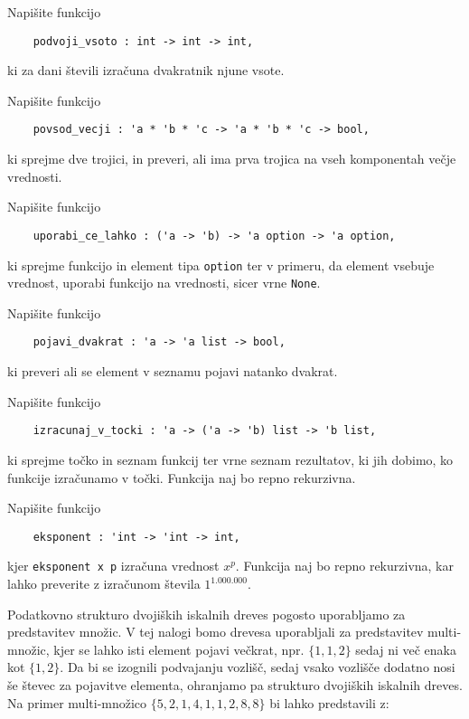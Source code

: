 \documentclass[arhiv]{../izpit}
\begin{document}

\naloga[]

\podnaloga
Napišite funkcijo
\begin{verbatim}
    podvoji_vsoto : int -> int -> int,
\end{verbatim}
ki za dani števili izračuna dvakratnik njune vsote.

\podnaloga
Napišite funkcijo
\begin{verbatim}
    povsod_vecji : 'a * 'b * 'c -> 'a * 'b * 'c -> bool,
\end{verbatim}
ki sprejme dve trojici, in preveri, ali ima prva trojica na vseh komponentah večje vrednosti.

\podnaloga
Napišite funkcijo
\begin{verbatim}
    uporabi_ce_lahko : ('a -> 'b) -> 'a option -> 'a option,
\end{verbatim}
ki sprejme funkcijo in element tipa \verb|option| ter v primeru, da element vsebuje vrednost, uporabi funkcijo na vrednosti, sicer vrne \verb|None|.

\podnaloga
Napišite funkcijo
\begin{verbatim}
    pojavi_dvakrat : 'a -> 'a list -> bool,
\end{verbatim}
ki preveri ali se element v seznamu pojavi natanko dvakrat.

\podnaloga
Napišite funkcijo
\begin{verbatim}
    izracunaj_v_tocki : 'a -> ('a -> 'b) list -> 'b list,
\end{verbatim}
ki sprejme točko in seznam funkcij ter vrne seznam rezultatov, ki jih dobimo, ko funkcije izračunamo v točki. Funkcija naj bo repno rekurzivna.

\podnaloga
Napišite funkcijo
\begin{verbatim}
    eksponent : 'int -> 'int -> int,
\end{verbatim}
kjer \verb|eksponent x p| izračuna vrednost $x^p$. Funkcija naj bo repno rekurzivna, kar lahko preverite z izračunom števila $1^{1.000.000}$.

\naloga
Podatkovno strukturo dvojiških iskalnih dreves pogosto uporabljamo za predstavitev množic. V tej nalogi bomo drevesa uporabljali za predstavitev multi-množic, kjer se lahko isti element pojavi večkrat, npr. $\{ 1, 1, 2 \}$ sedaj ni več enaka kot $\{ 1, 2 \}$. Da bi se izognili podvajanju vozlišč, sedaj vsako vozlišče dodatno nosi še števec za pojavitve elementa, ohranjamo pa strukturo dvojiških iskalnih dreves. Na primer multi-množico $\{5, 2, 1, 4, 1, 1, 2, 8, 8\}$ bi lahko predstavili z:
\end{document}
